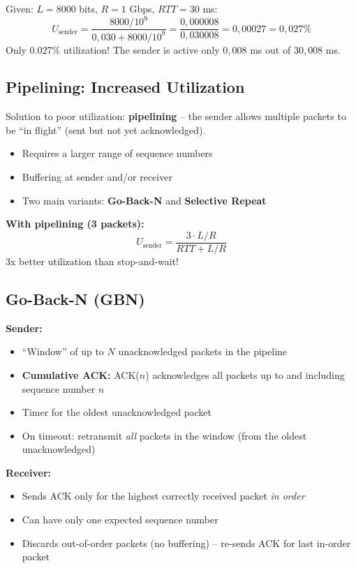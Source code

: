 \begin{exambox}
Given: $L = 8000$ bits, $R = 1$ Gbps, $RTT = 30$ ms:
\[
U_{\text{sender}} = \frac{8000 / 10^9}{0{,}030 + 8000/10^9} = \frac{0{,}000008}{0{,}030008} = 0{,}00027 = 0{,}027\%
\]
Only 0.027\% utilization! The sender is active only $0{,}008$ ms out of $30{,}008$ ms.
\end{exambox}

\subsection{Pipelining: Increased Utilization}

\begin{keybox}
Solution to poor utilization: \textbf{pipelining} -- the sender allows multiple packets to be ``in flight'' (sent but not yet acknowledged).
\begin{itemize}[noitemsep]
    \item Requires a larger range of sequence numbers
    \item Buffering at sender and/or receiver
    \item Two main variants: \textbf{Go-Back-N} and \textbf{Selective Repeat}
\end{itemize}

\textbf{With pipelining (3 packets):}
\[
U_{\text{sender}} = \frac{3 \cdot L/R}{RTT + L/R}
\]
3x better utilization than stop-and-wait!
\end{keybox}

\subsection{Go-Back-N (GBN)}

\begin{keybox}
\textbf{Sender:}
\begin{itemize}[noitemsep]
    \item ``Window'' of up to $N$ unacknowledged packets in the pipeline
    \item \textbf{Cumulative ACK:} ACK($n$) acknowledges all packets up to and including sequence number $n$
    \item Timer for the oldest unacknowledged packet
    \item On timeout: retransmit \emph{all} packets in the window (from the oldest unacknowledged)
\end{itemize}

\textbf{Receiver:}
\begin{itemize}[noitemsep]
    \item Sends ACK only for the highest correctly received packet \emph{in order}
    \item Can have only one expected sequence number
    \item Discards out-of-order packets (no buffering) -- re-sends ACK for last in-order packet
\end{itemize}
\end{keybox}


